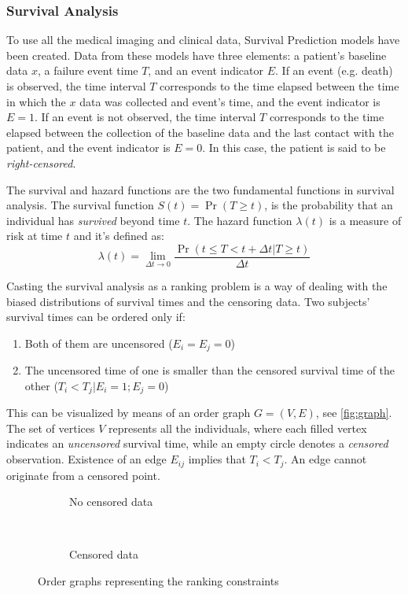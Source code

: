 \subsubsection{Survival Analysis}

To use all the medical imaging and clinical data, Survival Prediction models have been created. 
Data from these models have three elements: a patient's baseline data \( x \), a failure event 
time \( T \), and an event indicator \( E \). If an event (e.g. death) is observed, the time 
interval \( T \) corresponds to the time elapsed between the time in which the \( x \)
data was collected and event's time, and the event indicator is \( E = 1 \). If an
event is not observed, the time interval \( T \) corresponds to the time elapsed between
the collection of the baseline data and the last contact with the patient, and the 
event indicator is \( E = 0 \). In this case, the patient is said to be
\emph{right-censored}.
~\cite{medical:DeepSurv}

The survival and hazard functions are the two fundamental functions in survival analysis. The
survival function \( S(t) = \Pr(T \ge t) \), is the probability that an individual has
\emph{survived} beyond time \( t \). The hazard function \( \lambda(t) \) is a measure of risk at 
time \( t \) and it's defined as:
~\cite{medical:Cox}
\[
  \lambda(t) = \lim_{\Delta t \rightarrow 0}
  \frac{\Pr(t \le T < t + \Delta t | T \ge t)}{\Delta t}
\]

Casting the survival analysis as a ranking problem is a way of dealing with the biased
distributions of survival times and the censoring data. Two subjects' survival times can be 
ordered only if:
\begin{enumerate}[noitemsep, topsep=0pt]
  \item Both of them are uncensored (\( E_i = E_j = 0\))
  \item The uncensored time of one is smaller than the censored survival time of the other
  (\( T_i < T_j | E_i = 1; E_j = 0 \))
\end{enumerate}

This can be visualized by means of an order graph \( G = (V, E) \), see \autoref{fig:graph}.
The set of vertices \( V \) represents all the individuals, where each filled vertex indicates
an \emph{uncensored} survival time, while an empty circle denotes a \emph{censored} observation.
Existence of an edge \( E_{ij} \) implies that \( T_i < T_j \). An edge cannot originate 
from a censored point.

\begin{figure}
  \centering
  \begin{subfigure}[b]{.4\textwidth}
    \centering
    
    \caption{No censored data}
  \end{subfigure}
  ~
  \begin{subfigure}[b]{.4\textwidth}
    \centering
    
    \caption{Censored data}
  \end{subfigure}

  \caption{Order graphs representing the ranking constraints \label{fig:graph}}
\end{figure}

